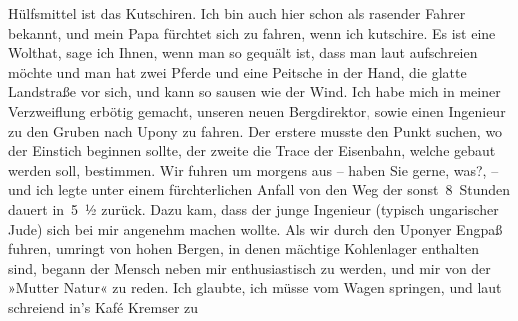                Hülfsmittel ist das Kutschiren. Ich bin auch hier schon als rasender Fahrer bekannt,
               und mein Papa fürchtet sich
               zu fahren, wenn ich kutschire. Es ist eine Wolthat, sage ich Ihnen, wenn man so
               gequält ist, dass man laut aufschreien möchte und man hat zwei Pferde und eine
               Peitsche in der Hand, die glatte Landstraße vor sich, und kann so sausen wie der
               Wind. Ich habe mich in meiner Verzweiflung erbötig gemacht, unseren neuen Bergdirektor\textcolor{gray}{,} sowie einen Ingenieur zu den Gruben nach Upony zu
               fahren. Der erstere musste den Punkt suchen, wo der Einstich beginnen sollte, der
               zweite die Trace der Eisenbahn, welche gebaut werden soll, bestimmen. Wir fuhren um  morgens aus – haben Sie gerne, was?,
               – und ich legte unter einem fürchterlichen Anfall von \label{K_L03105-3v}\label{K_L03105-3} den Weg der sonst 8 Stunden dauert in 5 ½{ }zurück. Dazu kam, dass der
               junge Ingenieur (typisch
                  ungarischer Jude) sich bei
               mir angenehm machen wollte. Als wir durch den Uponyer Engpaß fuhren, umringt von hohen Bergen, in denen mächtige
               Kohlenlager enthalten sind, be{\pb}gann der Mensch neben mir
               enthusiastisch zu werden, und mir von der »Mutter Natur« zu reden. Ich glaubte, ich
               müsse vom Wagen springen, und laut schreiend in’s Kafé Kremser zu
